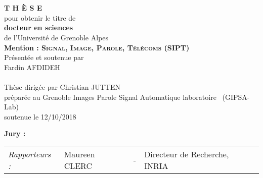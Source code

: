 \cleardoublepage
\begin{titlepage}
\begin{center}
 \\
\vspace*{0.3cm}
 \\
\vspace*{0.5cm}
\noindent \Huge \textbf{T H È S E} \\
\vspace*{0.3cm}
\noindent \large {pour obtenir le titre de} \\
\vspace*{0.3cm}
\noindent \LARGE \textbf{docteur en sciences} \\
\vspace*{0.3cm}
\noindent \Large de l'Université de Grenoble Alpes\\
\noindent \Large \textbf{Mention : \textsc{Signal, Image, Parole, Télécoms (SIPT)}}\\
\vspace*{0.4cm}
\noindent \large {Présentée et soutenue par\\}
\noindent \LARGE Fardin AFDIDEH \\
\vspace*{0.8cm}
 \\
\vspace*{0.8cm}
\noindent \Large Thèse dirigée par Christian JUTTEN \\
\vspace*{0.2cm}
\noindent \Large préparée au Grenoble Images Parole Signal Automatique laboratoire \ (GIPSA-Lab) \\
\vspace*{0.2cm}
\noindent \large soutenue le 12/10/2018 \\
\vspace*{0.5cm}
\end{center}
\noindent \large \textbf{Jury :} \\
\begin{center}
\noindent \large 
\begin{tabular}{llcl}
      \textit{Rapporteurs :}	&  Maureen CLERC		& - & Directeur de Recherche, INRIA\\ %

\end{tabular}
\end{center}
\end{titlepage}
